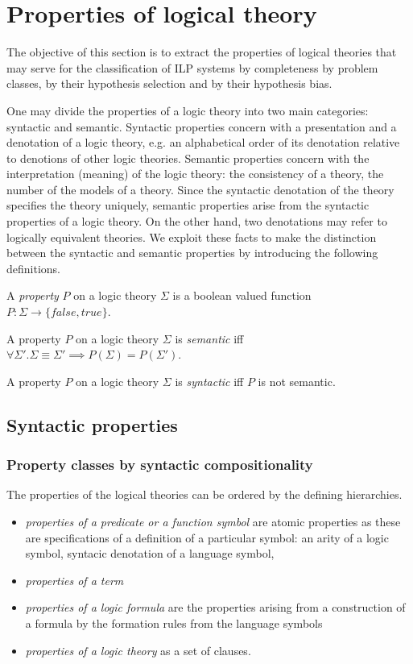 \section{Properties of logical theory}\label{sec:properties_of_logical_theory}
The objective of this section is to extract the properties of logical theories that may serve for the classification of ILP systems by completeness by problem classes, by their hypothesis selection and by their hypothesis bias.

One may divide the properties of a logic theory into two main categories:
syntactic and semantic. Syntactic properties concern with a presentation and a denotation of a logic theory, e.g. an alphabetical order of its denotation relative to denotions of other logic theories. Semantic properties concern with the interpretation (meaning) of the logic theory: the consistency of a theory, the number of the models of a theory. Since the syntactic denotation of the theory specifies the theory uniquely, semantic properties arise from the syntactic properties of a logic theory. On the other hand, two denotations may refer to logically equivalent theories. We exploit these facts to make the distinction between the syntactic and semantic properties by introducing the following definitions.

\begin{defn}
A \emph{property} $P$ on a logic theory $\Sigma$ is a boolean valued function $P:\Sigma \to \{false, true\}$.
\end{defn}

\begin{defn}
A property $P$ on a logic theory $\Sigma$ is \emph{semantic} iff
$\forall \Sigma'. \Sigma \equiv \Sigma' \implies P(\Sigma)=P(\Sigma')$.
\end{defn}

\begin{defn}
A property $P$ on a logic theory $\Sigma$ is \emph{syntactic} iff
$P$ is not semantic.
\end{defn}

\subsection{Syntactic properties}
\subsubsection{Property classes by syntactic compositionality}
The properties of the logical theories can be ordered by the defining hierarchies.
\begin{itemize}
\item \emph{properties of a predicate or a function symbol} are atomic properties as these are specifications of a definition of a particular symbol: an arity of a logic symbol, syntacic denotation of a language symbol,
\item \emph{properties of a term}
\item \emph{properties of a logic formula} are the properties arising from a construction of a formula by the formation rules from the language symbols
\item \emph{properties of a logic theory} as a set of clauses.
\end{itemize}

